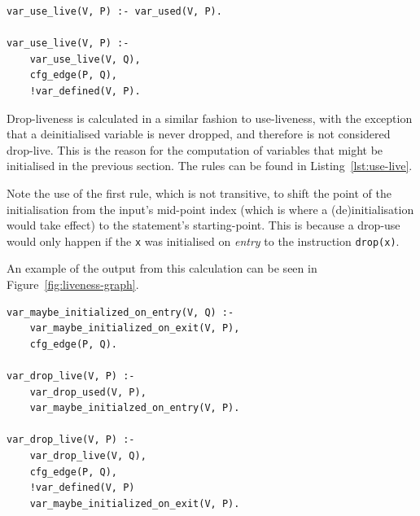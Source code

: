 \documentclass[11pt,a4paper,twoside,openany,draft]{report}
\newenvironment{sourcecode}{\captionsetup{type=listing}}{}
\newcommand{\InRust}[1]{\texttt{#1}}
\begin{document}
\begin{sourcecode}
  \label{lst:var-live}
\begin{verbatim}
var_use_live(V, P) :- var_used(V, P).

var_use_live(V, P) :-
    var_use_live(V, Q),
    cfg_edge(P, Q),
    !var_defined(V, P).
\end{verbatim}
\end{sourcecode}

Drop-liveness is calculated in a similar fashion to use-liveness, with the
exception that a deinitialised variable is never dropped, and therefore is not
considered drop-live. This is the reason for the computation of variables that
might be initialised in the previous section. The rules can be found in
Listing~\ref{lst:use-live}.

Note the use of the first rule, which is not transitive, to shift the point of
the initialisation from the input's mid-point index (which is where a
(de)initialisation would take effect) to the statement's starting-point. This is
because a drop-use would only happen if the \InRust{x} was initialised on
\textit{entry} to the instruction \InRust{drop(x)}.

An example of the output from this calculation can be seen in
Figure~\ref{fig:liveness-graph}.

\begin{sourcecode}
  \label{lst:use-live}
\begin{verbatim}
var_maybe_initialized_on_entry(V, Q) :-
    var_maybe_initialized_on_exit(V, P),
    cfg_edge(P, Q).

var_drop_live(V, P) :-
    var_drop_used(V, P),
    var_maybe_initialzed_on_entry(V, P).

var_drop_live(V, P) :-
    var_drop_live(V, Q),
    cfg_edge(P, Q),
    !var_defined(V, P)
    var_maybe_initialized_on_exit(V, P).
\end{verbatim}
\end{sourcecode}
\end{document}
